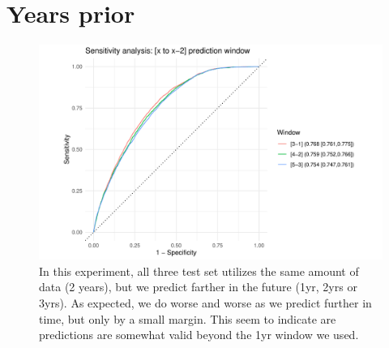 \documentclass[12pt]{article}
\begin{document}
\clearpage

\section*{Years prior}



\begin{figure}[h]
\centering
\includegraphics[width=1.0\textwidth]{figures/roc_window_2.pdf}
\caption{In this experiment, all three test set utilizes the same amount of data (2 years), 
but we predict farther in the future (1yr, 2yrs or 3yrs). As expected, we do worse and worse
as we predict further in time, but only by a small margin. This seem to indicate are predictions are 
somewhat valid beyond the 1yr window we used.}
\end{figure}
\end{document}

